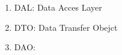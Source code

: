 \begin{enumerate}
    \item DAL: Data Acces Layer
    \item DTO: Data Transfer Obejct
    \item DAO: 
\end{enumerate}